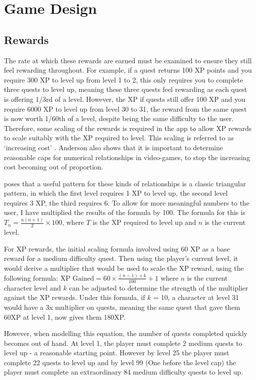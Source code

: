 \section{Game Design}
\subsection{Rewards}
The rate at which these rewards are earned must be examined to ensure they still feel rewarding throughout. 
For example, if a quest returns 100 XP points and you require 300 XP to level up from level 1 to 2, this only requires you to complete three quests to level up, meaning these three quests feel rewarding as each quest is offering 1/3rd of a level.
However, the XP if quests still offer 100 XP and you require 6000 XP to level up from level 30 to 31, the reward from the same quest is now worth 1/60th of a level, despite being the same difficulty to the user.
Therefore, some scaling of the rewards is required in the app to allow XP rewards to scale suitably with the XP required to level.
This scaling is referred to as `increasing cost' \citep{1_anderson_2016}.
Anderson also shows that it is important to determine reasonable caps for numerical relationships in video-games, to stop the increasing cost becoming out of proportion.

\cite{1_anderson_2016} poses that a useful pattern for these kinds of relationships is a classic triangular pattern, in which the first level requires 1 XP to level up, the second level requires 3 XP, the third requires 6. To allow for more meaningful numbers to the user, I have multiplied the results of the formula by 100. The formula for this is $T_n= \frac{n(n+1)}{2} \times 100$, where $T$ is the XP required to level up and $n$ is the current level.

For XP rewards, the initial scaling formula involved using 60 XP as a base reward for a medium difficulty quest.
Then using the player's current level, it would derive a multiplier that would be used to scale the XP reward, using the following formula: 
$\textrm{XP Gained} = 60 \times \frac{(n - 1) \times k}{100} + 1$ where $n$ is the current character level and $k$ can be adjusted to determine the strength of the multiplier against the XP rewards.
Under this formula, if $k$ = 10, a character at level 31 would have a 3x multiplier on quests, meaning the same quest that gave them 60XP at level 1, now gives them 180XP.

However, when modelling this equation, the number of quests completed quickly becomes out of hand. 
At level 1, the player must complete 2 medium quests to level up - a reasonable starting point.
However by level 25 the player must complete 22 quests to level up and by level 99 (One before the level cap) the player must complete an extraordinary 84 medium difficulty quests to level up.

